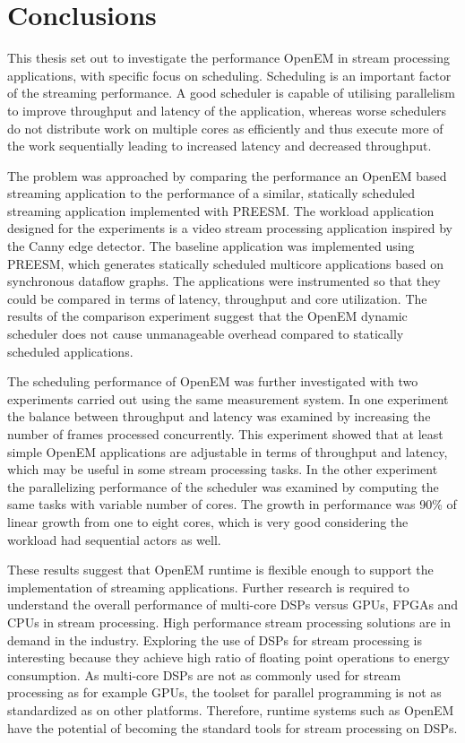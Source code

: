 \chapter{Conclusions}
\label{chapter:conclusion}
This thesis set out to investigate the performance OpenEM in stream processing applications, with specific focus on scheduling. Scheduling is an important factor of the streaming performance. A good scheduler is capable of utilising parallelism to improve throughput and latency of the application, whereas worse schedulers do not distribute work on multiple cores as efficiently and thus execute more of the work sequentially leading to increased latency and decreased throughput.

The problem was approached by comparing the performance an OpenEM based streaming application to the performance of a similar, statically scheduled streaming application implemented with PREESM. The workload application designed for the experiments is a video stream processing application inspired by the Canny edge detector. The baseline application was implemented using PREESM, which generates statically scheduled multicore applications based on synchronous dataflow graphs. The applications were instrumented so that they could be compared in terms of latency, throughput and core utilization. The results of the comparison experiment suggest that the OpenEM dynamic scheduler does not cause unmanageable overhead compared to statically scheduled applications. 

The scheduling performance of OpenEM was further investigated with two experiments carried out using the same measurement system. In one experiment the balance between throughput and latency was examined by increasing the number of frames processed concurrently. This experiment showed that at least simple OpenEM applications are adjustable in terms of throughput and latency, which may be useful in some stream processing tasks. In the other experiment the parallelizing performance of the scheduler was examined by computing the same tasks with variable number of cores. The growth in performance was 90\% of linear growth from one to eight cores, which is very good considering the workload had sequential actors as well.

These results suggest that OpenEM runtime is flexible enough to support the implementation of streaming applications. Further research is required to understand the overall performance of multi-core DSPs versus GPUs, FPGAs and CPUs in stream processing. High performance stream processing solutions are in demand in the industry. Exploring the use of DSPs for stream processing is interesting because they achieve high ratio of floating point operations to energy consumption. As multi-core DSPs are not as commonly used for stream processing as for example GPUs, the toolset for parallel programming is not as standardized as on other platforms. Therefore, runtime systems such as OpenEM have the potential of becoming the standard tools for stream processing on DSPs.
